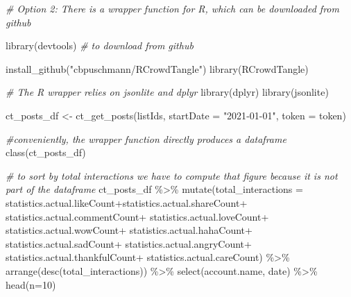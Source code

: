 \documentclass[
]{book}
\newenvironment{Shaded}{\begin{snugshade}}{\end{snugshade}}
\newcommand{\AttributeTok}[1]{\textcolor[rgb]{0.77,0.63,0.00}{#1}}
\newcommand{\CommentTok}[1]{\textcolor[rgb]{0.56,0.35,0.01}{\textit{#1}}}
\newcommand{\DecValTok}[1]{\textcolor[rgb]{0.00,0.00,0.81}{#1}}
\newcommand{\FunctionTok}[1]{\textcolor[rgb]{0.00,0.00,0.00}{#1}}
\newcommand{\NormalTok}[1]{#1}
\newcommand{\OtherTok}[1]{\textcolor[rgb]{0.56,0.35,0.01}{#1}}
\newcommand{\SpecialCharTok}[1]{\textcolor[rgb]{0.00,0.00,0.00}{#1}}
\newcommand{\StringTok}[1]{\textcolor[rgb]{0.31,0.60,0.02}{#1}}
\begin{document}
\begin{Shaded}
\begin{Highlighting}[]
\CommentTok{\# Option 2: There is a wrapper function for R, which can be downloaded from github}

\FunctionTok{library}\NormalTok{(devtools) }\CommentTok{\# to download from github}
 
\FunctionTok{install\_github}\NormalTok{(}\StringTok{"cbpuschmann/RCrowdTangle"}\NormalTok{)}
\FunctionTok{library}\NormalTok{(RCrowdTangle)}
 
\CommentTok{\# The R wrapper relies on jsonlite and dplyr}
\FunctionTok{library}\NormalTok{(dplyr)}
\FunctionTok{library}\NormalTok{(jsonlite)}
 
\NormalTok{ct\_posts\_df }\OtherTok{\textless{}{-}} \FunctionTok{ct\_get\_posts}\NormalTok{(listIds, }\AttributeTok{startDate =} \StringTok{"2021{-}01{-}01"}\NormalTok{, }\AttributeTok{token =}\NormalTok{ token)}
 
\CommentTok{\#conveniently, the wrapper function directly produces a dataframe}
\FunctionTok{class}\NormalTok{(ct\_posts\_df)}
 
\CommentTok{\# to sort by total interactions we have to compute that figure because it is not part of the dataframe}
\NormalTok{ct\_posts\_df }\SpecialCharTok{\%\textgreater{}\%}
  \FunctionTok{mutate}\NormalTok{(}\AttributeTok{total\_interactions =}\NormalTok{ statistics.actual.likeCount}\SpecialCharTok{+}\NormalTok{statistics.actual.shareCount}\SpecialCharTok{+}\NormalTok{ statistics.actual.commentCount}\SpecialCharTok{+}\NormalTok{  statistics.actual.loveCount}\SpecialCharTok{+}\NormalTok{ statistics.actual.wowCount}\SpecialCharTok{+}\NormalTok{ statistics.actual.hahaCount}\SpecialCharTok{+}\NormalTok{ statistics.actual.sadCount}\SpecialCharTok{+}
\NormalTok{           statistics.actual.angryCount}\SpecialCharTok{+}\NormalTok{ statistics.actual.thankfulCount}\SpecialCharTok{+}\NormalTok{ statistics.actual.careCount) }\SpecialCharTok{\%\textgreater{}\%}
  \FunctionTok{arrange}\NormalTok{(}\FunctionTok{desc}\NormalTok{(total\_interactions)) }\SpecialCharTok{\%\textgreater{}\%}
  \FunctionTok{select}\NormalTok{(account.name, date) }\SpecialCharTok{\%\textgreater{}\%}
  \FunctionTok{head}\NormalTok{(}\AttributeTok{n=}\DecValTok{10}\NormalTok{)}
 

\end{Highlighting}
\end{Shaded}
\end{document}
